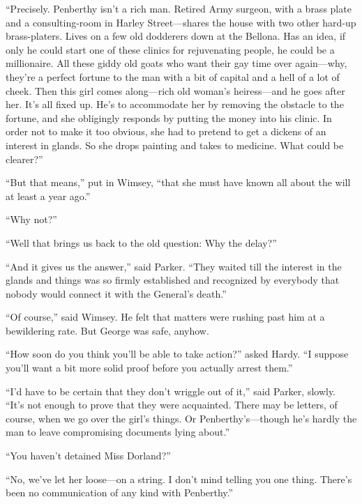 \enquote{Precisely. Penberthy isn't a rich man. Retired Army surgeon, with a brass plate and a consulting-room in Harley Street\allowbreak---\allowbreak shares the house with two other hard-up brass-platers. Lives on a few old dodderers down at the Bellona. Has an idea, if only he could start one of these clinics for rejuvenating people, he could be a millionaire. All these giddy old goats who want their gay time over again\allowbreak---\allowbreak why, they're a perfect fortune to the man with a bit of capital and a hell of a lot of cheek. Then this girl comes along\allowbreak---\allowbreak rich old woman's heiress\allowbreak---\allowbreak and he goes after her. It's all fixed up. He's to accommodate her by removing the obstacle to the fortune, and she obligingly responds by putting the money into his clinic. In order not to make it too obvious, she had to pretend to get a dickens of an interest in glands. So she drops painting and takes to medicine. What could be clearer?}

\enquote{But that means,} put in Wimsey, \enquote{that she must have known all about the will at least a year ago.}

\enquote{Why not?}

\enquote{Well that brings us back to the old question: Why the delay?}

\enquote{And it gives us the answer,} said Parker. \enquote{They waited till the interest in the glands and things was so firmly established and recognized by everybody that nobody would connect it with the General's death.}

\enquote{Of course,} said Wimsey. He felt that matters were rushing past him at a bewildering rate. But George was safe, anyhow.

\enquote{How soon do you think you'll be able to take action?} asked Hardy. \enquote{I suppose you'll want a bit more solid proof before you actually arrest them.}

\enquote{I'd have to be certain that they don't wriggle out of it,} said Parker, slowly. \enquote{It's not enough to prove that they were acquainted. There may be letters, of course, when we go over the girl's things. Or Penberthy's\allowbreak---\allowbreak though he's hardly the man to leave compromising documents lying about.}

\enquote{You haven't detained Miss Dorland?}

\enquote{No, we've let her loose\allowbreak---\allowbreak on a string. I don't mind telling you one thing. There's been no communication of any kind with Penberthy.}

